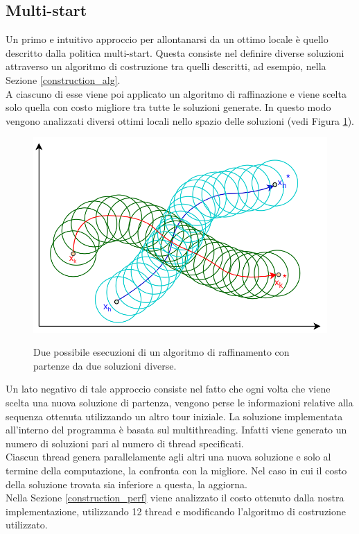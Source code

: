 \subsection{Multi-start}
Un primo e intuitivo approccio per allontanarsi da un ottimo locale è quello descritto dalla politica multi-start. Questa consiste nel definire diverse soluzioni attraverso un algoritmo di costruzione tra quelli descritti, ad esempio, nella Sezione \ref{construction_alg}.\\
A ciascuno di esse viene poi applicato un algoritmo di raffinazione e viene scelta solo quella con costo migliore tra tutte le soluzioni generate. In questo modo vengono analizzati diversi ottimi locali nello spazio delle soluzioni (vedi Figura \ref{multi_start}). 
\begin{figure}[H] 
\begin{center} 
  \includegraphics[scale=0.4]{Images/multistart}\\ 
  \caption{\footnotesize{Due possibile esecuzioni di un algoritmo di raffinamento con partenze da due soluzioni diverse.}}
  \label{multi_start}
\end{center}
\end{figure}
Un lato negativo di tale approccio consiste nel fatto che ogni volta che viene scelta una nuova soluzione di partenza, vengono perse le informazioni relative alla sequenza ottenuta utilizzando un altro tour iniziale. La soluzione implementata all'interno del programma è basata sul multithreading. Infatti viene generato un numero di soluzioni pari al numero di thread specificati.\\
Ciascun thread genera parallelamente agli altri una nuova soluzione e solo al termine della computazione, la confronta con la migliore. Nel caso in cui il costo della soluzione trovata sia inferiore a questa, la aggiorna. \\
Nella Sezione \ref{construction_perf} viene analizzato il costo ottenuto dalla nostra implementazione, utilizzando 12 thread e modificando l'algoritmo di costruzione utilizzato.\\

